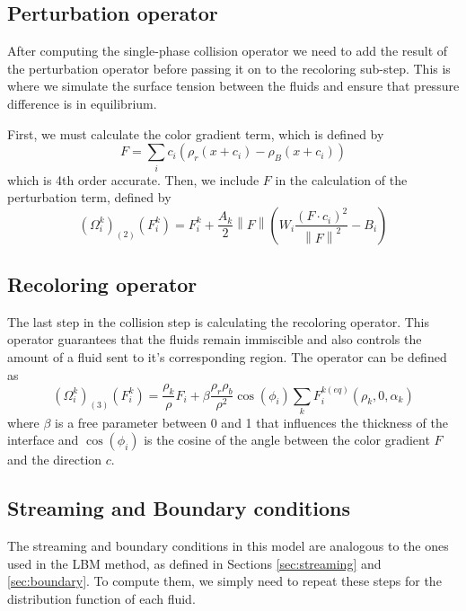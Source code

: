 \documentclass[12pt]{book}
\newcommand{\norm}[1]{\left\lVert#1\right\rVert}
\begin{document}
\subsection{Perturbation operator}
After computing the single-phase collision operator we need to add the result of the perturbation operator before passing it on to the recoloring sub-step. This is where we simulate the surface tension between the fluids and ensure that pressure difference is in equilibrium.\par
First, we must calculate the color gradient term, which is defined by
\begin{equation}\label{eq:colorGrad}
F = \sum_i c_i \left(\rho_r\left(x+c_i\right) - \rho_B\left(x+c_i\right)\right)
\end{equation}
which is 4th order accurate. Then, we include $F$ in the calculation of the perturbation term, defined by
\begin{equation}\label{eq:pert}
\left(\Omega_i^{k}\right)_{\left(2\right)}\left(F_i^k\right) = F_i^k + \frac{A_k}{2}\norm{F}\left(W_i\frac{\left(F\cdot c_i\right)^2}{\norm{F}^2} - B_i\right)
\end{equation}
\subsection{Recoloring operator}
The last step in the collision step is calculating the recoloring operator. This operator guarantees that the fluids remain immiscible and also controls the amount of a fluid sent to it's corresponding region. The operator can be defined as
\begin{equation}
\left(\Omega_i^{k}\right)_{\left(3\right)}\left(F_i^k\right) = \frac{\rho_k}{\rho}F_i + \beta\frac{\rho_r \rho_b}{\rho^2}\cos \left(\phi_i\right)\sum_k F_i^{k\left(eq\right)}\left(\rho_k,0,\alpha_k\right)
\end{equation}
where $\beta$ is a free parameter between 0 and 1 that influences the thickness of the interface and $\cos \left(\phi_i\right)$ is the cosine of the angle between the color gradient $F$ and the direction $c$.
\subsection{Streaming and Boundary conditions}
The streaming and boundary conditions in this model are analogous to the ones used in the LBM method, as defined in Sections \ref{sec:streaming} and \ref{sec:boundary}. To compute them, we simply need to repeat these steps for the distribution function of each fluid.
\end{document}
